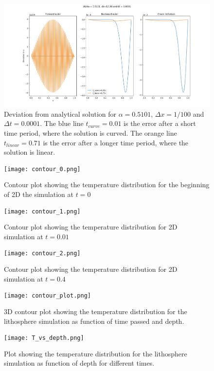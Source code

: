\documentclass{article}
\begin{document}
\begin{figure}[H]
	\centering
	\includegraphics[width=180mm]{1_100_a}
	\caption{Deviation from analytical solution for $\alpha=0.5101$, $\Delta x=1/100$ and $\Delta t =0.0001$. The blue line $t_{curve}=0.01$ is the error after a short time period, where the solution is curved. The orange line $t_{linear}=0.71$ is the error after a longer time period, where the solution is linear.}
	\label{fig:1_100_a}
\end{figure}

\begin{figure}[H]
	\centering
	\texttt{[image: contour\_0.png]}
	\caption{Contour plot showing the temperature distribution for the beginning of 2D the simulation at $t=0$}
	\label{fig:contour0}
\end{figure}

\begin{figure}[H]
	\centering
	\texttt{[image: contour\_1.png]}
	\caption{Contour plot showing the temperature distribution for 2D simulation at $t=0.01$}
	\label{fig:contour1}
\end{figure}

\begin{figure}[H]
	\centering
	\texttt{[image: contour\_2.png]}
	\caption{Contour plot showing the temperature distribution for 2D simulation at $t=0.4$}
	\label{fig:contour2}
\end{figure}

\begin{figure}[H]
	\centering
	\texttt{[image: contour\_plot.png]}
	\caption{3D contour plot showing the temperature distribution for the lithosphere simulation as function of time passed and depth.}
	\label{fig:contour_3d}
\end{figure}

\begin{figure}[H]
	\centering
	\texttt{[image: T\_vs\_depth.png]}
	\caption{Plot showing the temperature distribution for the lithosphere simulation as function of depth for different times.}
	\label{fig:T_vs_depth}
\end{figure}
\end{document}
